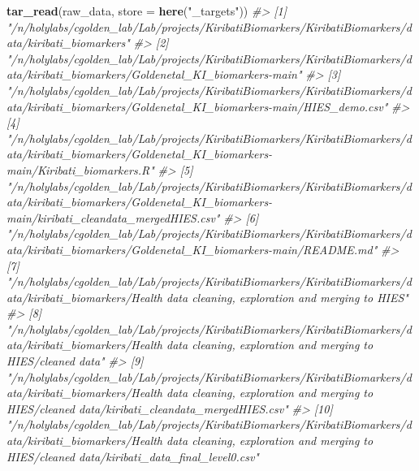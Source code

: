 \documentclass[]{article}
\newenvironment{Shaded}{\begin{snugshade}}{\end{snugshade}}
\newcommand{\CommentTok}[1]{\textcolor[rgb]{0.56,0.35,0.01}{\textit{#1}}}
\newcommand{\DataTypeTok}[1]{\textcolor[rgb]{0.13,0.29,0.53}{#1}}
\newcommand{\KeywordTok}[1]{\textcolor[rgb]{0.13,0.29,0.53}{\textbf{#1}}}
\newcommand{\NormalTok}[1]{#1}
\newcommand{\StringTok}[1]{\textcolor[rgb]{0.31,0.60,0.02}{#1}}
\begin{document}
\begin{Shaded}
\begin{Highlighting}[]
\KeywordTok{tar_read}\NormalTok{(raw_data, }\DataTypeTok{store =} \KeywordTok{here}\NormalTok{(}\StringTok{"_targets"}\NormalTok{))}
\CommentTok{#>  [1] "/n/holylabs/cgolden_lab/Lab/projects/KiribatiBiomarkers/KiribatiBiomarkers/data/kiribati_biomarkers"                                                                                                                           }
\CommentTok{#>  [2] "/n/holylabs/cgolden_lab/Lab/projects/KiribatiBiomarkers/KiribatiBiomarkers/data/kiribati_biomarkers/Goldenetal_KI_biomarkers-main"                                                                                             }
\CommentTok{#>  [3] "/n/holylabs/cgolden_lab/Lab/projects/KiribatiBiomarkers/KiribatiBiomarkers/data/kiribati_biomarkers/Goldenetal_KI_biomarkers-main/HIES_demo.csv"                                                                               }
\CommentTok{#>  [4] "/n/holylabs/cgolden_lab/Lab/projects/KiribatiBiomarkers/KiribatiBiomarkers/data/kiribati_biomarkers/Goldenetal_KI_biomarkers-main/Kiribati_biomarkers.R"                                                                       }
\CommentTok{#>  [5] "/n/holylabs/cgolden_lab/Lab/projects/KiribatiBiomarkers/KiribatiBiomarkers/data/kiribati_biomarkers/Goldenetal_KI_biomarkers-main/kiribati_cleandata_mergedHIES.csv"                                                           }
\CommentTok{#>  [6] "/n/holylabs/cgolden_lab/Lab/projects/KiribatiBiomarkers/KiribatiBiomarkers/data/kiribati_biomarkers/Goldenetal_KI_biomarkers-main/README.md"                                                                                   }
\CommentTok{#>  [7] "/n/holylabs/cgolden_lab/Lab/projects/KiribatiBiomarkers/KiribatiBiomarkers/data/kiribati_biomarkers/Health data cleaning, exploration and merging to HIES"                                                                     }
\CommentTok{#>  [8] "/n/holylabs/cgolden_lab/Lab/projects/KiribatiBiomarkers/KiribatiBiomarkers/data/kiribati_biomarkers/Health data cleaning, exploration and merging to HIES/cleaned data"                                                        }
\CommentTok{#>  [9] "/n/holylabs/cgolden_lab/Lab/projects/KiribatiBiomarkers/KiribatiBiomarkers/data/kiribati_biomarkers/Health data cleaning, exploration and merging to HIES/cleaned data/kiribati_cleandata_mergedHIES.csv"                      }
\CommentTok{#> [10] "/n/holylabs/cgolden_lab/Lab/projects/KiribatiBiomarkers/KiribatiBiomarkers/data/kiribati_biomarkers/Health data cleaning, exploration and merging to HIES/cleaned data/kiribati_data_final_level0.csv"                         }

\end{Highlighting}
\end{Shaded}
\end{document}
